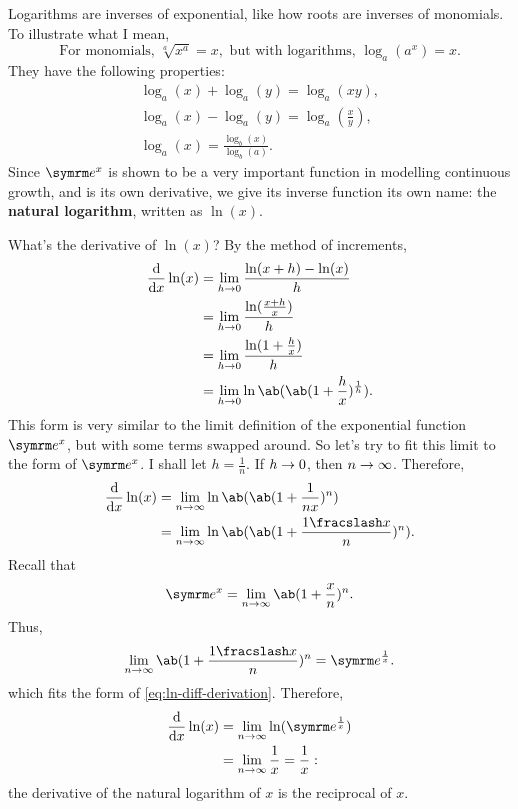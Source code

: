 Logarithms are inverses of exponential, like how roots are inverses of monomials. To illustrate what I mean,
\begin{equation*}
  \textrm{For monomials, } \sqrt[a]{x^a} = x, \textrm{ but with logarithms, } \log_{a}(a^x) = x.
\end{equation*}
They have the following properties:
\begin{gather}
  \log_a(x) + \log_a(y) = \log_a(xy), \\
  \log_a(x) - \log_a(y) = \log_a\left(\frac{x}{y}\right), \\
  \log_a(x) = \frac{\log_b(x)}{\log_b(a)}.
\end{gather}
Since $\e^x$ is shown to be a very important function in modelling continuous growth, and is its own derivative, we give its inverse function its own name: the \textbf{natural logarithm}, written as $\ln(x)$.

What's the derivative of $\ln(x)$? By the method of increments,
\begin{align}
  \odv*{\ln(x)}{x} & = \lim_{h \appr 0}\frac{\ln(x + h) - \ln(x)}{h}                \\
                   & = \lim_{h \appr 0}\frac{\ln(\frac{x + h}{x})}{h}               \\
                   & = \lim_{h \appr 0}\frac{\ln(1 + \frac{h}{x})}{h}               \\
                   & = \lim_{h \appr 0}\ln\ab(\ab(1 + \frac{h}{x})^{\frac{1}{h}}).
\end{align}
This form is very similar to the limit definition of the exponential function $\e^x$, but with some terms swapped around. So let's try to fit this limit to the form of $\e^x$. I shall let $h = \frac{1}{n}$. If $h \rightarrow 0$, then $n \rightarrow \infty$. Therefore,
\begin{align}
  \odv*{\ln(x)}{x} & = \lim_{n \appr \infty}\ln\ab(\ab(1 + \frac{1}{nx})^{n})                                           \\
                   & = \lim_{n \appr \infty}\ln\ab(\ab(1 + \frac{\flatfrac{1}{x}}{n})^n). \label{eq:ln-diff-derivation}
\end{align}
Recall that
\begin{equation}
  \e^x = \lim_{n \appr \infty}\ab(1 + \frac{x}{n})^n.
\end{equation}
Thus,
\begin{equation}
  \lim_{n \appr \infty}\ab(1 + \frac{\flatfrac{1}{x}}{n})^n = \e^{\frac{1}{x}}.
\end{equation}
which fits the form of \cref{eq:ln-diff-derivation}. Therefore,
\begin{align}
  \odv*{\ln(x)}{x} & = \lim_{n \appr \infty}\ln(\e^{\frac{1}{x}})       \\
                   & = \lim_{n \appr \infty}\frac{1}{x} = \frac{1}{x}:
\end{align}
the derivative of the natural logarithm of $x$ is the reciprocal of $x$.

